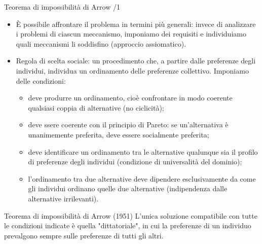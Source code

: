 \documentclass[aspectratio=64,11pt]{beamer}
\begin{document}
\begin{frame}{Teorema di impossibilità di Arrow /1}
\begin{itemize}
\item È possibile affrontare il problema in termini più generali: invece di
analizzare i problemi di ciascun meccanismo, imponiamo dei requisiti e
individuiamo quali meccanismi li soddisfino (approccio assiomatico).
\item \alert{Regola di scelta sociale}: un procedimento che, a partire dalle preferenze
degli individui, individua un ordinamento delle preferenze
collettivo. Imponiamo delle condizioni:
\begin{itemize}
\item deve produrre un ordinamento, cioè confrontare in modo coerente qualsiasi
coppia di alternative (no ciclicità);
\item deve ssere coerente con il \alert{principio di Pareto}: se un'alternativa è
unanimemente preferita, deve essere socialmente preferita;
\item deve identificare un ordinamento tra le alternative qualunque sia il
profilo di preferenze degli individui (condizione di \alert{universalità} del
dominio);
\item l'ordinamento tra due alternative deve dipendere esclusivamente da come
gli individui ordinano quelle due alternative 
(\alert{indipendenza dalle alternative irrilevanti}).
\end{itemize}
\end{itemize}
\begin{block}{Teorema di impossibilità di Arrow (1951)}
L'unica soluzione compatibile con tutte le condizioni indicate è quella
"dittatoriale", in cui la preferenze di un individuo prevalgono sempre sulle
preferenze di tutti gli altri.
\end{block}
\end{frame}
\end{document}
